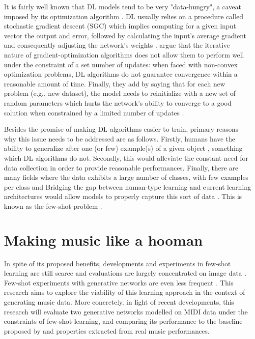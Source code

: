 \documentclass[a4paper]{book}
\begin{document}
It is fairly well known that DL models tend to be very "data-hungry", a caveat imposed by its optimization algorithm \parencite{chen_closer_2018, ravi_optimization_2016}. DL usually relies on a procedure called stochastic gradient descent (SGC) which implies computing for a given input vector the output and error, followed by calculating the input's average gradient and consequently adjusting the network's weights \parencite{lecun_deep_2015}. \textcite{ravi_optimization_2016} argue that the iterative nature of gradient-optimization algorithms does not allow them to perform well under the constraint of a set number of updates: when faced with non-convex optimization problems, DL algorithms do not guarantee convergence within a reasonable amount of time. Finally, they add by saying that for each new problem (e.g., new dataset), the model needs to reinitialize with a new set of random parameters which hurts the network's ability to converge to a good solution when constrained by a limited number of updates \parencite{ravi_optimization_2016}.

Besides the promise of making DL algorithms easier to train, primary reasons why this issue needs to be addressed are as follows. Firstly, humans have the ability to generalize after one (or few) example(s) of a given object \parencite{vinyals_matching_2016, chen_closer_2018, ravi_optimization_2016}, something which DL algorithms do not. Secondly, this would alleviate the constant need for data collection in order to provide reasonable performances. Finally, there are many fields where the data exhibits a large number of classes, with few examples per class and Bridging the gap between human-type learning and current learning architectures would allow models to properly capture this sort of data \parencite{ravi_optimization_2016, larochelle_few-shot_2017}. This is known as the few-shot problem \parencite{chen_closer_2018, vinyals_matching_2016, larochelle_few-shot_2017}.

\section{Making music like a hooman} \label{sec:thesis_goal}

In spite of its proposed benefits, developments and experiments in few-shot learning are still scarce \parencite{larochelle_few-shot_2017} and evaluations are largely concentrated on image data \parencite[see][]{lake_omniglot_2019, clouatre_figr_2019, vinyals_matching_2016, chen_closer_2018, ravi_optimization_2016}. Few-shot experiments with generative networks are even less frequent \parencite{zhang_metagan_2018, clouatre_figr_2019}. This research aims to explore the viability of this learning approach in the context of generating music data. More concretely, in light of recent developments, this research will evaluate two generative networks modelled on MIDI data under the constraints of few-shot learning, and comparing its performance to the baseline proposed by \textcite{larochelle_few-shot_2017} and properties extracted from real music performances.
\end{document}
